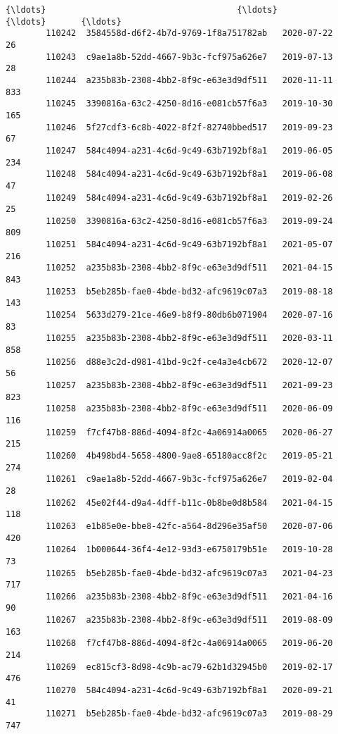 \documentclass[11pt]{article}
\begin{document}
\begin{Verbatim}[commandchars=\\\{\}]
        {\ldots}                                      {\ldots}          {\ldots}       {\ldots}   
        110242  3584558d-d6f2-4b7d-9769-1f8a751782ab   2020-07-22        26   
        110243  c9ae1a8b-52dd-4667-9b3c-fcf975a626e7   2019-07-13        28   
        110244  a235b83b-2308-4bb2-8f9c-e63e3d9df511   2020-11-11       833   
        110245  3390816a-63c2-4250-8d16-e081cb57f6a3   2019-10-30       165   
        110246  5f27cdf3-6c8b-4022-8f2f-82740bbed517   2019-09-23        67   
        110247  584c4094-a231-4c6d-9c49-63b7192bf8a1   2019-06-05       234   
        110248  584c4094-a231-4c6d-9c49-63b7192bf8a1   2019-06-08        47   
        110249  584c4094-a231-4c6d-9c49-63b7192bf8a1   2019-02-26        25   
        110250  3390816a-63c2-4250-8d16-e081cb57f6a3   2019-09-24       809   
        110251  584c4094-a231-4c6d-9c49-63b7192bf8a1   2021-05-07       216   
        110252  a235b83b-2308-4bb2-8f9c-e63e3d9df511   2021-04-15       843   
        110253  b5eb285b-fae0-4bde-bd32-afc9619c07a3   2019-08-18       143   
        110254  5633d279-21ce-46e9-b8f9-80db6b071904   2020-07-16        83   
        110255  a235b83b-2308-4bb2-8f9c-e63e3d9df511   2020-03-11       858   
        110256  d88e3c2d-d981-41bd-9c2f-ce4a3e4cb672   2020-12-07        56   
        110257  a235b83b-2308-4bb2-8f9c-e63e3d9df511   2021-09-23       823   
        110258  a235b83b-2308-4bb2-8f9c-e63e3d9df511   2020-06-09       116   
        110259  f7cf47b8-886d-4094-8f2c-4a06914a0065   2020-06-27       215   
        110260  4b498bd4-5658-4800-9ae8-65180acc8f2c   2019-05-21       274   
        110261  c9ae1a8b-52dd-4667-9b3c-fcf975a626e7   2019-02-04        28   
        110262  45e02f44-d9a4-4dff-b11c-0b8be0d8b584   2021-04-15       118   
        110263  e1b85e0e-bbe8-42fc-a564-8d296e35af50   2020-07-06       420   
        110264  1b000644-36f4-4e12-93d3-e6750179b51e   2019-10-28        73   
        110265  b5eb285b-fae0-4bde-bd32-afc9619c07a3   2021-04-23       717   
        110266  a235b83b-2308-4bb2-8f9c-e63e3d9df511   2021-04-16        90   
        110267  a235b83b-2308-4bb2-8f9c-e63e3d9df511   2019-08-09       163   
        110268  f7cf47b8-886d-4094-8f2c-4a06914a0065   2019-06-20       214   
        110269  ec815cf3-8d98-4c9b-ac79-62b1d32945b0   2019-02-17       476   
        110270  584c4094-a231-4c6d-9c49-63b7192bf8a1   2020-09-21        41   
        110271  b5eb285b-fae0-4bde-bd32-afc9619c07a3   2019-08-29       747   
        

\end{Verbatim}
\end{document}
